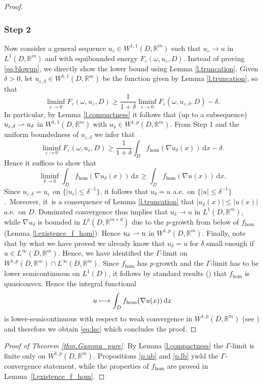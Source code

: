 \documentclass[JEP,XML,SOM,Unicode,published]{cedram}
\def\mto{\mathchoice{\longmapsto}{\mapsto}{\mapsto}{\mapsto}}
\def\harptod{\mathrel{\relbar\joinrel\rightharpoonup}}
\def\harpto{\mathchoice{\harptod}{\rightharpoonup}{\rightharpoonup}{\rightharpoonup}}
\theoremstyle{definition}
\let\e\varepsilon
\let\w\omega
\newcommand{\dx}{\,\mathrm{d}x}
\newcommand{\R}{\mathbb{R}}
\begin{document}
\begin{proof}
\subsubsection*{Step 2} Now consider a general sequence $u_{\e}\in W^{1,1}(D,\R^m)$ such that $u_{\e}\to u$ in $L^1(D,\R^m)$ and with equibounded energy $F_{\e}(\w,u_{\e},D)$. Instead of proving \eqref{eq:blowup}, we directly show the lower bound using Lemma \ref{l.truncation}. Given $\delta>0$, let $u_{\e,\delta}\in W^{1,1}(D,\R^m)$ be the function given by Lemma \ref{l.truncation}, so that
\begin{equation*}
\liminf_{\e\to 0}F_{\e}(\w,u_{\e},D)\geq \frac{1}{1+\delta}\liminf_{\e\to 0}F_{\e}(\w,u_{\e,\delta},D)-\delta.
\end{equation*}
In particular, by Lemma \ref{l.compactness} it follows that (up to a subsequence) $u_{\e,\delta}\harpto u_{\delta}$ in $W^{1,1}(D,\R^m)$ with $u_{\delta}\in W^{1,p}(D,\R^m)$. From Step 1 and the uniform boundedness of $u_{\e,\delta}$ we infer that
\begin{equation*}
\liminf_{\e\to 0}F_{\e}(\w,u_{\e},D)\geq \frac{1}{1+\delta}\int_Df_{\hom}(\nabla u_{\delta}(x))\dx-\delta.
\end{equation*}
Hence it suffices to show that
\begin{equation}\label{eq:lsc}
\liminf_{\delta\to 0}\int_D f_{\hom}(\nabla u_{\delta}(x))\dx\geq \int_D f_{\hom}(\nabla u(x))\dx.
\end{equation}
Since $u_{\e,\delta}=u_{\e}$ on $\{|u_{\e}|\leq\delta^{-1}\}$, it follows that $u_{\delta}=u$ a.e.\ on $\{|u|\leq \delta^{-1}\}$.~Moreover, it~is a consequence of Lemma \ref{l.truncation} that $|u_{\delta}(x)|\leq |u(x)|$ a.e.\ on $D$. Dominated convergence thus implies that $u_{\delta}\to u$ in $L^1(D,\R^m)$, while $\nabla u_{\delta}$ is bounded in $L^p(D,\R^{m\times d})$ due to the $p$-growth from below of $f_{\hom}$ (\cf Lemma \ref{l.existence_f_hom}). Hence $u_{\delta}\harpto u$ in $W^{1,p}(D,\R^m)$. Finally, note that by what we have proved we already know that $u_{\delta}=u$ for $\delta$ small enough if $u\in L^{\infty}(D,\R^m)$. Hence, we have identified the $\Gamma$-limit on $W^{1,p}(D,\R^m)\cap L^{\infty}(D,\R^m)$. Since $f_{\hom}$ has $p$-growth and the $\Gamma$-limit has to be lower semicontinuous on $L^1(D)$, it follows by standard results (\cite[Th.\,8.4]{Da}) that $f_{\hom}$ is quasiconvex. Hence the integral functional
\begin{equation*}
u\mto \int_D f_{\hom}(\nabla u(x))\dx
\end{equation*}
is lower-semicontinuous with respect to weak convergence in $W^{1,p}(D,\R^m)$ (see \cite[Th.\,8.11]{Da}) and therefore we obtain \eqref{eq:lsc} which concludes the proof.
\end{proof}
\begin{proof}[Proof of Theorem \ref{thm.Gamma_pure}]
By Lemma \ref{l.compactness} the $\Gamma$-limit is finite only on $W^{1,p}(D,\R^m)$. Propositions \ref{p.ub} and \ref{p.lb} yield the $\Gamma$-convergence statement, while the properties of $f_{\hom}$ are proved in Lemma~\ref{l.existence_f_hom}.
\end{proof}
\end{document}

